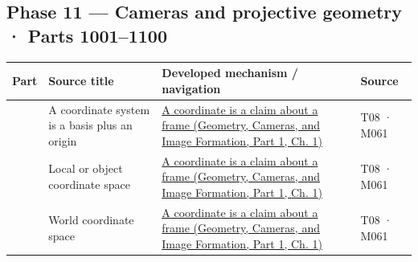 \subsection{Phase 11 --- Cameras and projective geometry · Parts 1001--1100}\label{appendix-fd090d982a15-phase-11-cameras-and-projective-geometry-parts-10011100}

\hypertarget{appendix-fd090d982a15-phase-11-cameras-and-projective-geometry-parts-10011100}{}

{\def\LTcaptype{none} %
\begin{longtable}[]{@{}
  >{\raggedleft\arraybackslash}p{}
  >{\raggedright\arraybackslash}p{}
  >{\raggedright\arraybackslash}p{}
  >{\raggedright\arraybackslash}p{}@{}}
\toprule\noalign{}
\begin{minipage}[b]{\linewidth}\raggedleft
Part
\end{minipage} & \begin{minipage}[b]{\linewidth}\raggedright
Source title
\end{minipage} & \begin{minipage}[b]{\linewidth}\raggedright
Developed mechanism / navigation
\end{minipage} & \begin{minipage}[b]{\linewidth}\raggedright
Source
\end{minipage} \\
\midrule\noalign{}
\endhead
\bottomrule\noalign{}
\endlastfoot
1001 & A coordinate system is a basis plus an origin & \href{../03-Geometry-Cameras-and-Image-Formation-P01/main.pdf\#02-foundations-ii-ch032-a-coordinate-is-a-claim-about-a-frame}{A coordinate is a claim about a frame (Geometry, Cameras, and Image Formation, Part 1, Ch. 1)} & T08 · M061 \\
1002 & Local or object coordinate space & \href{../03-Geometry-Cameras-and-Image-Formation-P01/main.pdf\#02-foundations-ii-ch032-a-coordinate-is-a-claim-about-a-frame}{A coordinate is a claim about a frame (Geometry, Cameras, and Image Formation, Part 1, Ch. 1)} & T08 · M061 \\
1003 & World coordinate space & \href{../03-Geometry-Cameras-and-Image-Formation-P01/main.pdf\#02-foundations-ii-ch032-a-coordinate-is-a-claim-about-a-frame}{A coordinate is a claim about a frame (Geometry, Cameras, and Image Formation, Part 1, Ch. 1)} & T08 · M061 \\

\end{longtable}}
